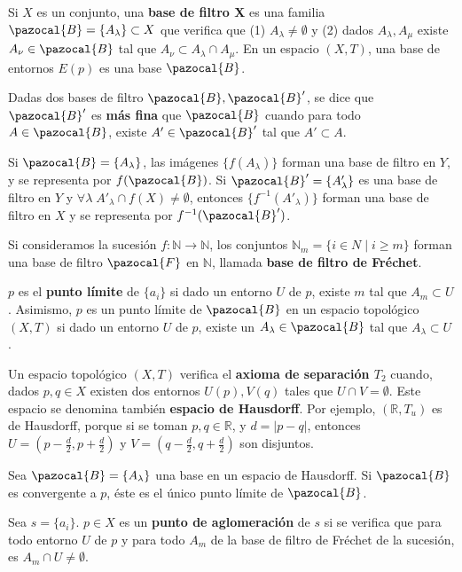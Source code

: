 \documentclass[a4paper, 11pt]{extarticle}
\let\mathcal\pazocal
\begin{document}
Si \(X\) es un conjunto, una \textbf{base de filtro X} es una familia \(\mathcal{B}
  = \{ A_\lambda \} \subset X\) que verifica que (1) \(A_\lambda \neq \emptyset\) y (2) dados \(A_\lambda, A_\mu\) existe \(A_\nu \in \mathcal{B}\) tal que \(A_\nu
  \subset A_\lambda \cap A_\mu\). En un espacio \((X,T)\), una base de
entornos \(E(p)\) es una base \(\mathcal{B}\).

Dadas dos bases de filtro \(\mathcal{B}, \mathcal{B}'\), se dice que \(\mathcal{B}'\) es \textbf{más fina} que \(\mathcal{B}\) cuando para todo \(A \in
\mathcal{B}\), existe \(A' \in \mathcal{B}'\) tal que \(A' \subset A\).

Si \(\mathcal{B} = \{ A_\lambda \}\), las imágenes \(\{ f(A_\lambda) \}\)
forman una base de filtro en \(Y\), y se representa por \(f(\mathcal{B})\).
Si \(\mathcal{B}' = \{ A'_\lambda \}\) es una base de filtro en \(Y\) y \(\forall \lambda\; A'_\lambda \cap f(X) \neq \emptyset\), entonces \(\{ f ^{-1}
(A'_\lambda)\}\) forman una base de filtro en \(X\) y se representa por \(f
^{-1}(\mathcal{B}')\).

Si consideramos la sucesión \(f: \mathbb{N} \rightarrow 
\mathbb{N}\), los conjuntos \(\mathbb{N}_m = \{ i \in N \;|\; i \ge m \}\) forman una base de filtro \(\mathcal{F}\) en \(\mathbb{N}\), llamada \textbf{base de filtro de Fréchet}.

\(p\) es el \textbf{punto límite} de \(\{ a_i \}\) si dado un entorno \(U\) de \(p\), existe \(m\) tal que \(A_m \subset U\). Asimismo, \(p\) es un punto límite de \(\mathcal{B}\) en un espacio
topológico \((X,T)\) si dado un entorno
\(U\) de \(p\), existe un \(A_\lambda  \in \mathcal{B}\) tal que \(A_\lambda \subset U\). 

Un espacio topológico \((X,T)\) verifica el \textbf{axioma de separación \(T_2\)}
cuando, dados \(p,q \in X\) existen dos entornos \(U(p), V(q)\) tales que \(U \cap V = \emptyset\). Este espacio se denomina también \textbf{espacio de Hausdorff}. 
Por ejemplo, \((\mathbb{R}, T_u)\) es de Hausdorff, porque si se toman \(p,q
\in \mathbb{R}\), y \(d = |p-q|\), entonces \(U = (p-\frac{d }{2}, p+\frac{d
}{2})\) y \(V = (q-\frac{d }{2}, q+\frac{d
}{2})\) son disjuntos.

Sea \(\mathcal{B} = \{ A_{\lambda} \}\) una base en un espacio de Hausdorff.
Si \(\mathcal{B}\) es convergente a \(p\), éste es el único punto límite de
\(\mathcal{B}\). 

Sea \(s = \{ a_i \}\). \(p \in X\) es un \textbf{punto de aglomeración} de \(s\) si
se verifica que para todo entorno \(U\) de \(p\) y para todo \(A_m\) de la
base de filtro de Fréchet de la sucesión, es \(A_m \cap U \neq \emptyset\).
\end{document}
